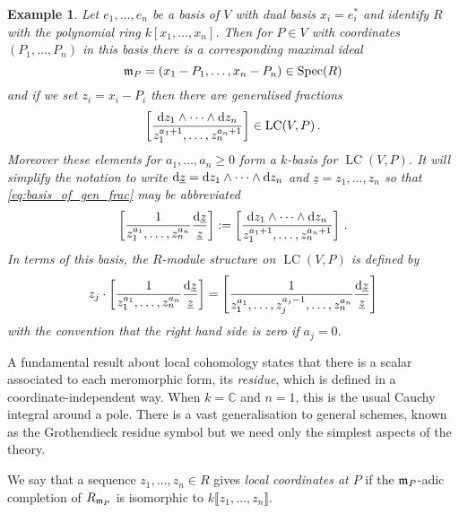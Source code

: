 \documentclass[english,letter paper,12pt,reqno]{article}
\theoremstyle{example}
\newtheorem{example}[theorem]{Example}
\numberwithin{equation}{section}
\DeclareMathOperator{\Spec}{Spec}
\DeclareMathOperator{\LC}{LC}
\begin{document}
\begin{example}\label{example:coordinates_V} Let $e_1,\ldots,e_n$ be a basis of $V$ with dual basis $x_i = e_i^*$ and identify $R$ with the polynomial ring $k[x_1,\ldots,x_n]$. Then for $P \in V$ with coordinates $(P_1,\ldots,P_n)$ in this basis there is a corresponding maximal ideal
\[
\mf{m}_P = (x_1 - P_1, \ldots, x_n - P_n) \in \Spec(R)
\]
and if we set $z_i = x_i - P_i$ then there are generalised fractions
\begin{equation}\label{eq:basis_of_gen_frac}
\left[ \frac{\ud{z_1} \wedge \cdots \wedge \ud{z_n}}{z_1^{a_1+1}, \ldots, z_n^{a_n+1}} \right] \in \LC(V, P)\,.
\end{equation}
Moreover these elements for $a_1,\ldots,a_n \ge 0$ form a $k$-basis for $\LC(V,P)$. It will simplify the notation to write $\operatorname{d}\!{\underline{z}} = \operatorname{d}\!{z_1} \wedge \cdots \wedge \operatorname{d}\!{z_n}$ and $\underline{z} = z_1, \ldots, z_n$ so that \eqref{eq:basis_of_gen_frac} may be abbreviated
\begin{equation}\label{eq:basic_residue_symbols}
\left[ \frac{1}{z_1^{a_1}, \ldots, z_n^{a_n}} \frac{\operatorname{d}\!{\underline{z}}}{\underline{z}} \right] := \left[ \frac{\operatorname{d}\!{z_1} \wedge \cdots \wedge \operatorname{d}\!{z_n}}{z_1^{a_1+1}, \ldots, z_n^{a_n+1}} \right]\,.
\end{equation}
In terms of this basis, the $R$-module structure on $\LC(V,P)$ is defined by
\begin{equation}\label{eq:Ractionres}
z_j \cdot \left[ \frac{1}{z_1^{a_1}, \ldots, z_n^{a_n}} \frac{\operatorname{d}\!{\underline{z}}}{\underline{z}} \right] = \left[ \frac{1}{z_1^{a_1}, \ldots, z_j^{a_j-1}, \ldots, z_n^{a_n}} \frac{\operatorname{d}\!{\underline{z}}}{\underline{z}} \right]
\end{equation}
with the convention that the right hand side is zero if $a_j = 0$.
\end{example}

A fundamental result about local cohomology states that there is a scalar associated to each meromorphic form, its \emph{residue}, which is defined in a coordinate-independent way. When $k = \mathbb{C}$ and $n = 1$, this is the usual Cauchy integral around a pole. There is a vast generalisation to general schemes, known as the Grothendieck residue symbol \cite{residuesduality, lipman_notes} but we need only the simplest aspects of the theory.

We say that a sequence $z_1,\ldots,z_n \in R$ gives \emph{local coordinates at $P$} if the $\mathfrak{m}_P$-adic completion of $R_{\mathfrak{m}_P}$ is isomorphic to $k \llbracket z_1,\ldots,z_n \rrbracket$.
\end{document}
